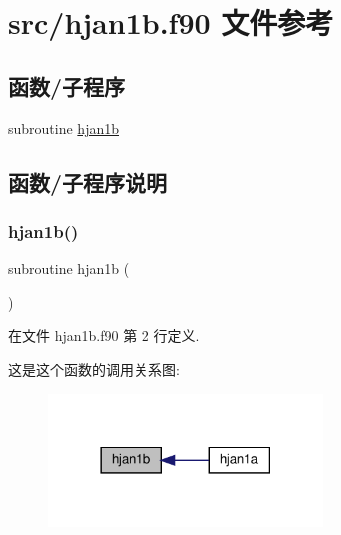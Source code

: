\hypertarget{hjan1b_8f90}{}\section{src/hjan1b.f90 文件参考}
\label{hjan1b_8f90}
\subsection*{函数/子程序}
\begin{DoxyCompactItemize}
\item 
subroutine \mbox{\hyperlink{hjan1b_8f90_a2722538b624eb16f99a9ef649c1051d8}{hjan1b}}
\end{DoxyCompactItemize}


\subsection{函数/子程序说明}
\mbox{\label{hjan1b_8f90_a2722538b624eb16f99a9ef649c1051d8}} 
\subsubsection{\texorpdfstring{hjan1b()}{hjan1b()}}
{\footnotesize\ttfamily subroutine hjan1b (\begin{DoxyParamCaption}{ }\end{DoxyParamCaption})}



在文件 hjan1b.\+f90 第 2 行定义.

这是这个函数的调用关系图\+:
\nopagebreak
\begin{figure}[H]
\begin{center}
\leavevmode
\includegraphics[width=206pt]{hjan1b_8f90_a2722538b624eb16f99a9ef649c1051d8_icgraph}
\end{center}
\end{figure}
